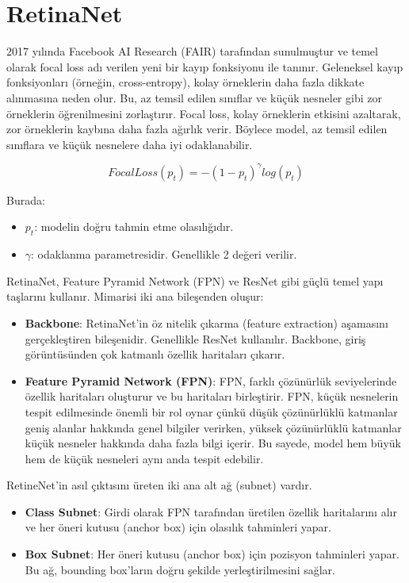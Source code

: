 \section{RetinaNet}

2017 yılında Facebook AI Research (FAIR) tarafından sunulmuştur ve temel olarak focal loss adı verilen yeni bir kayıp fonksiyonu ile tanınır. Geleneksel kayıp fonksiyonları (örneğin, cross-entropy), kolay örneklerin daha fazla dikkate alınmasına neden olur. Bu, az temsil edilen sınıflar ve küçük nesneler gibi zor örneklerin öğrenilmesini zorlaştırır. Focal loss, kolay örneklerin etkisini azaltarak, zor örneklerin kaybına daha fazla ağırlık verir. Böylece model, az temsil edilen sınıflara ve küçük nesnelere daha iyi odaklanabilir.

\[ Focal Loss (p_t) = -(1 - p_t)^\gamma log(p_t) \]

Burada:

\begin{itemize}
    \item $p_t$: modelin doğru tahmin etme olasılığıdır.
    \item $\gamma$: odaklanma parametresidir. Genellikle 2 değeri verilir.
\end{itemize}

RetinaNet, Feature Pyramid Network (FPN) ve ResNet gibi güçlü temel yapı taşlarını kullanır. Mimarisi iki ana bileşenden oluşur:

\begin{itemize}
    \item \textbf{Backbone}: RetinaNet’in öz nitelik çıkarma (feature extraction) aşamasını gerçekleştiren bileşenidir. Genellikle ResNet kullanılır. Backbone, giriş görüntüsünden çok katmanlı özellik haritaları çıkarır.
    \item \textbf{Feature Pyramid Network (FPN)}: FPN, farklı çözünürlük seviyelerinde özellik haritaları oluşturur ve bu haritaları birleştirir. FPN, küçük nesnelerin tespit edilmesinde önemli bir rol oynar çünkü düşük çözünürlüklü katmanlar geniş alanlar hakkında genel bilgiler verirken, yüksek çözünürlüklü katmanlar küçük nesneler hakkında daha fazla bilgi içerir. Bu sayede, model hem büyük hem de küçük nesneleri aynı anda tespit edebilir.
\end{itemize}

RetineNet'in asıl çıktısını üreten iki ana alt ağ (subnet) vardır.

\begin{itemize}
    \item \textbf{Class Subnet}: Girdi olarak FPN tarafından üretilen özellik haritalarını alır ve her öneri kutusu (anchor box) için olasılık tahminleri yapar.
    \item \textbf{Box Subnet}: Her öneri kutusu (anchor box) için pozisyon tahminleri yapar. Bu ağ, bounding box’ların doğru şekilde yerleştirilmesini sağlar.
\end{itemize}


